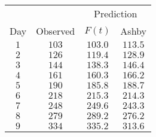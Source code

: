 \begin{tabular}{cccc}                            \toprule
    &          & \multicolumn{2}{c}{Prediction} \\
  \cmidrule{3-4}
Day & Observed & $F(t)$    & Ashby   \\\midrule
$1$ & $103$    & $103.0$   & $113.5$ \\[4pt]
$2$ & $126$    & $119.4$   & $128.9$ \\[4pt]
$3$ & $144$    & $138.3$   & $146.4$ \\[4pt]
$4$ & $161$    & $160.3$   & $166.2$ \\[4pt]
$5$ & $190$    & $185.8$   & $188.7$ \\[4pt]
$6$ & $218$    & $215.3$   & $214.3$ \\[4pt]
$7$ & $248$    & $249.6$   & $243.3$ \\[4pt]
$8$ & $279$    & $289.2$   & $276.2$ \\[4pt]
$9$ & $334$    & $335.2$   & $313.6$ \\\bottomrule
\end{tabular}
